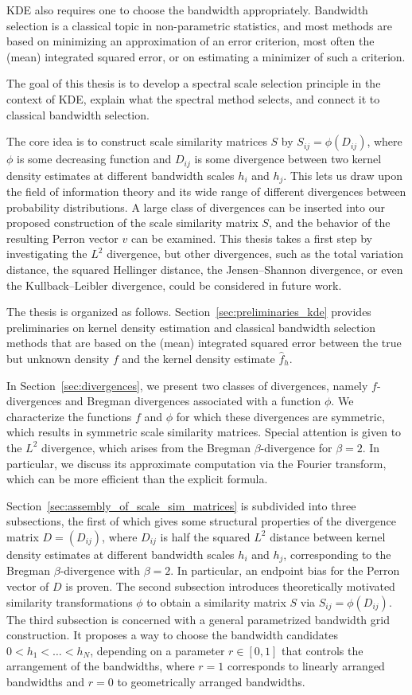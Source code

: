 KDE also requires one to choose the bandwidth appropriately. Bandwidth selection is a classical topic in non-parametric statistics, and most methods are based on minimizing an approximation of an error criterion, most often the (mean) integrated squared error, or on estimating a minimizer of such a criterion.

The goal of this thesis is to develop a spectral scale selection principle in the context of KDE, explain what the spectral method selects, and connect it to classical bandwidth selection.

The core idea is to construct scale similarity matrices $S$ by $S_{ij}=\phi(D_{ij})$, where $\phi$ is some decreasing function and $D_{ij}$ is some divergence between two kernel density estimates at different bandwidth scales $h_i$ and $h_j$. This lets us draw upon the field of information theory and its wide range of different divergences between probability distributions. A large class of divergences can be inserted into our proposed construction of the scale similarity matrix $S$, and the behavior of the resulting Perron vector $v$ can be examined. This thesis takes a first step by investigating the $L^2$ divergence, but other divergences, such as the total variation distance, the squared Hellinger distance, the Jensen--Shannon divergence, or even the Kullback--Leibler divergence, could be considered in future work.

The thesis is organized as follows. Section~\ref{sec:preliminaries_kde} provides preliminaries on kernel density estimation and classical bandwidth selection methods that are based on the (mean) integrated squared error between the true but unknown density $f$ and the kernel density estimate $\hat{f}_h$.

In Section~\ref{sec:divergences}, we present two classes of divergences, namely $f$-divergences and Bregman divergences associated with a function $\phi$. We characterize the functions $f$ and $\phi$ for which these divergences are symmetric, which results in symmetric scale similarity matrices. Special attention is given to the $L^2$ divergence, which arises from the Bregman $\beta$-divergence for $\beta=2$. In particular, we discuss its approximate computation via the Fourier transform, which can be more efficient than the explicit formula.

Section~\ref{sec:assembly_of_scale_sim_matrices} is subdivided into three subsections, the first of which gives some structural properties of the divergence matrix $D=(D_{ij})$, where $D_{ij}$ is half the squared $L^2$ distance between kernel density estimates at different bandwidth scales $h_i$ and $h_j$, corresponding to the Bregman $\beta$-divergence with $\beta=2$. In particular, an endpoint bias for the Perron vector of $D$ is proven. The second subsection introduces theoretically motivated similarity transformations $\phi$ to obtain a similarity matrix $S$ via $S_{ij}=\phi(D_{ij})$. The third subsection is concerned with a general parametrized bandwidth grid construction. It proposes a way to choose the bandwidth candidates $0<h_1<\dots<h_N$, depending on a parameter $r\in[0,1]$ that controls the arrangement of the bandwidths, where $r=1$ corresponds to linearly arranged bandwidths and $r=0$ to geometrically arranged bandwidths.

